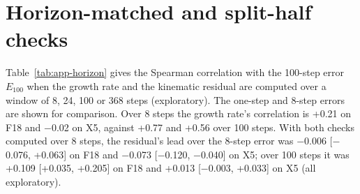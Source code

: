 \section{Horizon-matched and split-half checks}\label{app:A3}
Table~\ref{tab:app-horizon} gives the Spearman correlation with the 100-step error $E_{100}$ when the growth rate
and the kinematic residual are computed over a window of 8, 24, 100 or 368 steps (exploratory). The one-step and 8-step
errors are shown for comparison. Over 8 steps the growth rate's correlation is +0.21 on F18 and
$-$0.02 on X5, against +0.77 and +0.56 over 100 steps.
With both checks computed over 8 steps, the residual's lead over the 8-step error was $-$0.006
[$-$0.076, +0.063] on F18 and $-$0.073 [$-$0.120, $-$0.040] on X5; over 100 steps it was
+0.109 [+0.035, +0.205] on F18 and +0.013 [$-$0.003, +0.033] on X5 (all exploratory).

\begin{table}[h]
\centering
\caption{Spearman correlation of each check with $E_{100}$ by the window the check is computed over, for F18 (4 held-out
trajectories; all simulators, trained, compressed) and X5 (20 trajectories) (exploratory).}
\label{tab:app-horizon}
\footnotesize
\setlength{\tabcolsep}{4pt}
\end{table}

